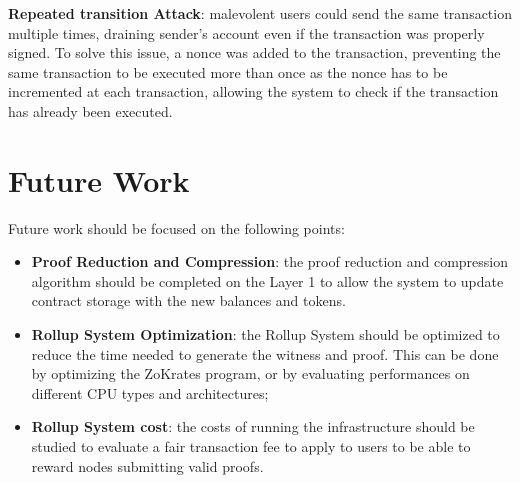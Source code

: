 \textbf{Repeated transition Attack}: malevolent users could send the same transaction multiple times, draining sender's account even if the transaction was properly signed. To solve this issue, a nonce was added to the transaction, preventing the same transaction to be executed more than once as the nonce has to be incremented at each transaction, allowing the system to check if the transaction has already been executed.


\section{Future Work}

Future work should be focused on the following points:

\vspace{-0.11in}
\begin{itemize}
	\item \textbf{Proof Reduction and Compression}: the proof reduction and compression algorithm should be completed on the Layer 1 to allow the system to update contract storage with the new balances and tokens.
	      \vspace{-0.11in}
	\item \textbf{Rollup System Optimization}: the Rollup System should be optimized to reduce the time needed to generate the witness and proof. This can be done by optimizing the ZoKrates program, or by evaluating performances on different CPU types and architectures;
	\item \textbf{Rollup System cost}: the costs of running the infrastructure should be studied to evaluate a fair transaction fee to apply to users to be able to reward nodes submitting valid proofs.
\end{itemize}


